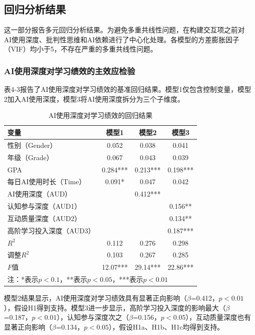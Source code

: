 \documentclass{njtech-thesis}
\begin{document}
\subsection{回归分析结果}

这一部分报告多元回归分析结果。为避免多重共线性问题，在构建交互项之前对AI使用深度、批判性思维和AI依赖进行了中心化处理。各模型的方差膨胀因子（VIF）均小于5，不存在严重的多重共线性问题。

\subsubsection{AI使用深度对学习绩效的主效应检验}

表4-3报告了AI使用深度对学习绩效的基准回归结果。模型1仅包含控制变量，模型2加入AI使用深度，模型3将AI使用深度拆分为三个子维度。

\begin{table}[htbp]
  \centering
  \caption{AI使用深度对学习绩效的回归结果}
  \begin{tabular}{lccc}
    \toprule
    变量 & 模型1 & 模型2 & 模型3 \\
    \midrule
    性别（Gender） & 0.052 & 0.038 & 0.041 \\
    年级（Grade） & 0.067 & 0.043 & 0.039 \\
    GPA & 0.284*** & 0.213*** & 0.198*** \\
    每日AI使用时长（Time） & 0.091* & 0.047 & 0.042 \\
    AI使用深度（AUD） &  & 0.412*** &  \\
    认知参与深度（AUD1） &  &  & 0.156** \\
    互动质量深度（AUD2） &  &  & 0.134** \\
    高阶学习投入深度（AUD3） &  &  & 0.187*** \\
    \midrule
    $R^2$ & 0.112 & 0.276 & 0.298 \\
    调整$R^2$ & 0.103 & 0.267 & 0.285 \\
    $F$值 & 12.07*** & 29.14*** & 22.86*** \\
    \bottomrule
    \multicolumn{4}{l}{\footnotesize 注：*表示$p<0.1$，**表示$p<0.05$，***表示$p<0.01$}
  \end{tabular}
\end{table}

模型2结果显示，AI使用深度对学习绩效具有显著正向影响（$\beta$=0.412，$p<0.01$），假设H1得到支持。模型3进一步显示，高阶学习投入深度的影响最大（$\beta$=0.187，$p<0.01$），认知参与深度次之（$\beta$=0.156，$p<0.05$），互动质量深度也有显著正向影响（$\beta$=0.134，$p<0.05$），假设H1a、H1b、H1c均得到支持。
\end{document}

